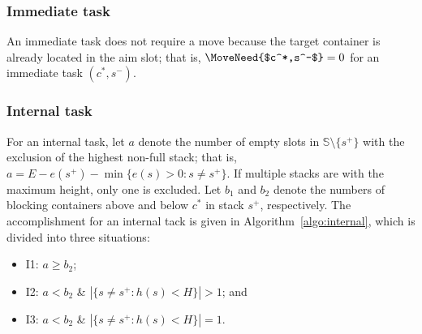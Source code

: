 \documentclass[review,3p,times,12pt,number]{elsarticle}\usepackage{amsmath}\usepackage{amssymb}
\begin{document}
\subsubsection{Immediate task}

An immediate task does not require a move because the target container is already located in the aim slot; that is, $\MoveNeed{$c^*,s^-$}=0$ for an immediate task $(c^*,s^-)$.

\subsubsection{Internal task}

For an internal task, let $a$ denote the number of empty slots in $\mathbb{S}\setminus\{s^+\}$ with the exclusion of the highest non-full stack; that is, $a=E-e(s^+)-\min\{e(s)>0: s\neq s^+\}$. If multiple stacks are with the maximum height, only one is excluded. Let $b_1$ and $b_2$ denote the numbers of blocking containers above and below $c^*$ in stack $s^+$, respectively. The accomplishment for an internal tack is given in  Algorithm~\ref{algo:internal}, which is divided into three situations:
\begin{itemize}
\item I1: $a\ge b_2$;
\item I2: $a<b_2$ \& $|\{s\neq s^+: h(s)<H\}|>1$; and
\item I3: $a<b_2$ \& $|\{s\neq s^+: h(s)<H\}|=1$.
\end{itemize}
\end{document}
